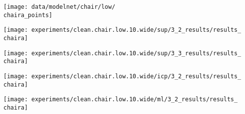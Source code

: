 {\begin{minipage}[t]{0.02\textwidth}
    \vspace{1.5mm}
\end{minipage}
\begin{minipage}[t]{0.10\textwidth}
	\vspace{0px}\centering
	\texttt{[image: data/modelnet/chair/low/\\chaira\_points]}
\end{minipage}
\begin{minipage}[t]{0.10\textwidth}
	\vspace{0px}\centering
	\texttt{[image: experiments/clean.chair.low.10.wide/sup/3\_2\_results/results\_\\chaira]}
\end{minipage}
\begin{minipage}[t]{0.10\textwidth}
	\vspace{0px}\centering
	\texttt{[image: experiments/clean.chair.low.10.wide/sup/3\_3\_results/results\_\\chaira]}
\end{minipage}
\begin{minipage}[t]{0.10\textwidth}
	\vspace{0px}\centering
	\texttt{[image: experiments/clean.chair.low.10.wide/icp/3\_2\_results/results\_\\chaira]}
\end{minipage}
\begin{minipage}[t]{0.10\textwidth}
    \vspace{0px}\centering
    \texttt{[image: experiments/clean.chair.low.10.wide/ml/3\_2\_results/results\_\\chaira]}
\end{minipage}
\begin{minipage}[t]{0.10\textwidth}

\end{minipage}}
